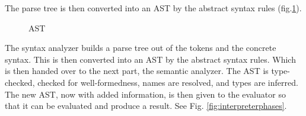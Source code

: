 The parse tree is then converted into an \gls{AST} by the abstract syntax rules (fig.\ref{fig:ast}).

\begin{figure}[!h]
    \centering
    \begin{minipage}{0.6\textwidth}
    \end{minipage}
    \label{fig:ast}
    \caption{AST}
\end{figure}

The syntax analyzer builds a parse tree out of the tokens and the concrete syntax. 
This is then converted into an AST by the abstract syntax rules. 
Which is then handed over to the next part, the \gls{semantic analyzer}.
The AST is type-checked, checked for well-formedness, names are resolved, and types are inferred. The new AST, now with added information, is then given to the evaluator so that it can be evaluated and produce a result.
See Fig. \ref{fig:interpreterphases}.

